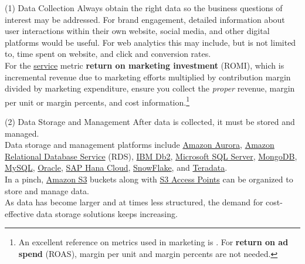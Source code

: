 \documentclass[pdf]{beamer}
\newcommand{\empr}[1]{{\color{franklinblue}\textbf{#1}}}
\theoremstyle{remark}
\theoremstyle{definition}
\begin{document}
\begin{frame}[t]{(1) Data Collection}
Always obtain the right data so the business questions of interest may be addressed. For brand engagement, detailed information about user interactions within their own website, social media, and other digital platforms would be useful.  For web analytics this may include, but is not limited to, time spent on website, and click and conversion rates. \\
\vspace{1.5ex}
For the \underline{service} metric \empr{return on marketing investment} (ROMI), which is incremental revenue due to marketing efforts multiplied by contribution margin divided by marketing expenditure, ensure you collect the \textit{proper} revenue, margin per unit or margin percents, and cost information.\footnote{An excellent reference on metrics used in marketing is \cite{bendle2020}.  For \empr{return on ad spend} (ROAS), margin per unit and margin percents are not needed.}  
\end{frame}

\begin{frame}[t]{(2) Data Storage and Management}
After data is collected, it must be stored and managed.  \\
\vspace{1.5ex} 
Data storage and management platforms include \href{https://aws.amazon.com/rds/aurora/}{Amazon Aurora}, \href{https://aws.amazon.com/rds/}{Amazon Relational Database Service} (RDS), \href{https://www.ibm.com/products/db2}{IBM Db2}, \href{https://www.microsoft.com/en-us/sql-server/sql-server-downloads}{Microsoft SQL Server}, \href{https://www.mongodb.com/atlas/database}{MongoDB}, \href{https://dev.mysql.com/}{MySQL}, \href{https://www.oracle.com/database/}{Oracle}, \href{https://www.sap.com/sea/products/technology-platform/hana.html}{SAP Hana Cloud}, \href{https://www.snowflake.com/en/}{SnowFlake}, and \href{https://www.teradata.com/}{Teradata}.  \\
\vspace{1.5ex}
In a pinch, \href{https://aws.amazon.com/s3/}{Amazon S3} buckets along with \href{https://aws.amazon.com/s3/features/access-points/}{S3 Access Points} can be organized to store and manage data.  \\
\vspace{1.5ex}
As data has become larger and at times less structured, the demand for cost-effective data storage solutions keeps increasing. \\ 
\end{frame}
\end{document}
